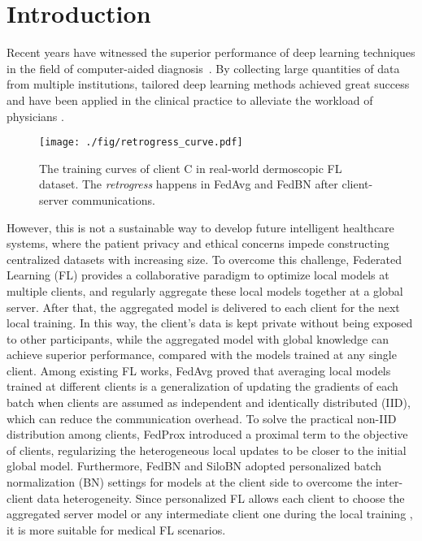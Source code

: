 \documentclass[runningheads]{llncs}
\begin{document}
\section{Introduction}
Recent years have witnessed the superior performance of deep learning techniques in the field of computer-aided diagnosis~\cite{esteva2019guide,bhattacharya2020corrsignet,zhu2020alleviating}. By collecting large quantities of data from multiple institutions, tailored deep learning methods achieved great success and have been applied in the clinical practice to alleviate the workload of physicians \cite{liu2020clinical,esteva2017dermatologist,lotter2021robust}. 
\begin{figure}[thb]
    \centering
    \texttt{[image: ./fig/retrogress\_curve.pdf]}
    \caption{The training curves of client C in real-world dermoscopic FL dataset. The \textit{retrogress} happens in FedAvg \cite{fedavg} and FedBN \cite{li2021fedbn} after client-server communications. }
    \label{retrogress_curve}
\end{figure}
However, this is not a sustainable way to develop future intelligent healthcare systems, where the patient privacy and ethical concerns impede constructing centralized datasets with increasing size. To overcome this challenge, Federated Learning (FL) \cite{li2020federated,rieke2020future} provides a collaborative paradigm to optimize local models at multiple clients, and regularly aggregate these local models together at a global server. After that, the aggregated model is delivered to each client for the next local training. In this way, the client's data is kept private without being exposed to other participants, while the aggregated model with global knowledge can achieve superior performance, compared with the models trained at any single client. Among existing FL works, FedAvg \cite{fedavg,dou2021federated} proved that averaging local models trained at different clients is a generalization of updating the gradients of each batch when clients are assumed as independent and identically distributed (IID), which can reduce the communication overhead. To solve the practical non-IID distribution among clients, FedProx \cite{fedprox} introduced a proximal term to the objective of clients, regularizing the heterogeneous local updates to be closer to the initial global model.
Furthermore, FedBN \cite{li2021fedbn} and SiloBN \cite{andreux2020siloed} adopted personalized batch normalization (BN) settings for models at the client side to overcome the inter-client data heterogeneity. Since personalized FL allows each client to choose the aggregated server model or any intermediate client one during the local training \cite{federated_mutual,roth2020federated}, it is more suitable for medical FL scenarios.
\end{document}
